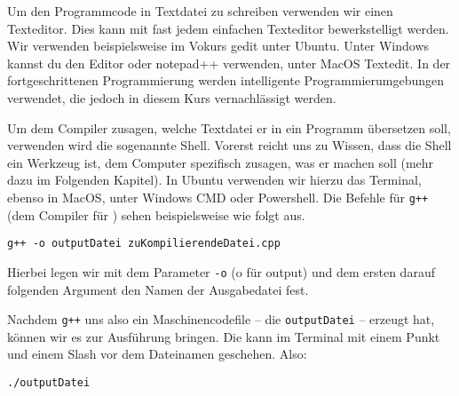 Um den Programmcode in Textdatei zu schreiben verwenden wir einen Texteditor.
Dies kann mit fast jedem einfachen Texteditor bewerkstelligt werden. Wir verwenden beispielsweise im Vokurs gedit unter Ubuntu.
Unter Windows kannst du den Editor oder notepad++ verwenden, unter MacOS Textedit. 
In der fortgeschrittenen Programmierung werden intelligente Programmierumgebungen verwendet, die jedoch in diesem Kurs vernachlässigt werden.

Um dem Compiler zusagen, welche Textdatei er in ein Programm übersetzen soll, verwenden wird die sogenannte Shell. Vorerst reicht uns zu Wissen, dass die Shell
ein Werkzeug ist, dem Computer spezifisch zusagen, was er machen soll (mehr dazu im Folgenden Kapitel). In Ubuntu verwenden wir hierzu das Terminal, ebenso in MacOS,
unter Windows CMD oder Powershell. Die Befehle für \texttt{g++} (dem Compiler für \Cpp) sehen beispielsweise wie folgt aus.

\begin{center}
    \texttt{g++ -o outputDatei zuKompilierendeDatei.cpp}
\end{center}
Hierbei legen wir mit dem Parameter \texttt{-o} (o für output) und dem ersten darauf folgenden Argument den Namen der Ausgabedatei fest.

Nachdem \texttt{g++} uns also ein Maschinencodefile -- die \texttt{outputDatei} --
erzeugt hat, können wir es zur Ausführung bringen. Die kann im Terminal mit einem Punkt und einem Slash vor dem Dateinamen geschehen. Also:
\begin{center}
    \texttt{./outputDatei}
\end{center}



